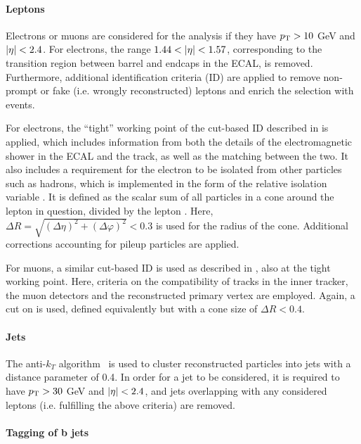 \paragraph{Leptons}

Electrons or muons are considered for the analysis if they have $p_{\mathrm{T}} > 10$ GeV and $|\eta| < 2.4$. For electrons, the range $1.44 < |\eta| < 1.57$, corresponding to the transition region between barrel and endcaps in the ECAL, is removed. Furthermore, additional identification criteria (ID) are applied to remove non-prompt or fake (i.e. wrongly reconstructed) leptons and enrich the selection with \ttbar events.

For electrons, the ``tight'' working point of the cut-based ID described in  is applied, which includes information from both the details of the electromagnetic shower in the ECAL and the track, as well as the matching between the two. It also includes a requirement for the electron to be isolated from other particles such as hadrons, which is implemented in the form of the relative isolation variable \Irel. It is defined as the scalar \pt sum of all particles in a cone around the lepton in question, divided by the lepton \pt. Here, $\Delta R = \sqrt{(\Delta \eta)^2 + (\Delta \varphi)^2} < 0.3$ is used for the radius of the cone. Additional corrections accounting for pileup particles are applied.

For muons, a similar cut-based ID is used as described in , also at the tight working point. Here, criteria on the compatibility of tracks in the inner tracker, the muon detectors and the reconstructed primary vertex are employed. Again, a cut on \Irel is used, defined equivalently but with a cone size of $\Delta R < 0.4$.

\paragraph{Jets}

The anti-$k_T$ algorithm~\cite{Cacciari:2008gp} is used to cluster reconstructed particles into jets with a distance parameter of 0.4. In order for a jet to be considered, it is required to have $p_{\mathrm{T}} > 30$ GeV and $|\eta| < 2.4$, and jets overlapping with any considered leptons (i.e. fulfilling the above criteria) are removed. %

\paragraph{Tagging of b jets}

